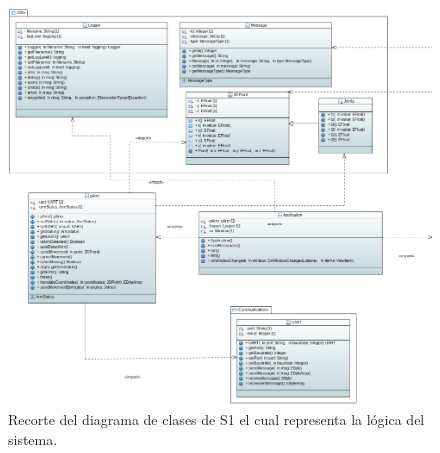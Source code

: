 \begin{figure}[H]
    \centering
    \includegraphics[width=\linewidth]{pictures/S1ClassDiagramLogic.PNG}
    \caption{Recorte del diagrama de clases de \ac{S1} el cual representa la lógica del sistema.}
    \label{fig:diagrama_clases_logica_s1}
\end{figure}

